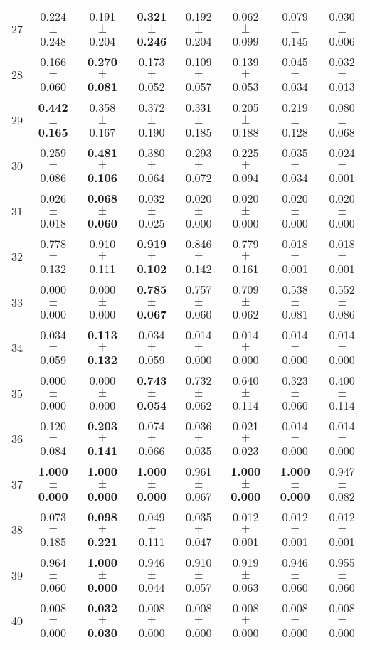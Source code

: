 \begin{table}[!ht]
{\begin{tabular}{r c c c c c c c}
27 & 0.224 $\pm$ 0.248 & 0.191 $\pm$ 0.204 & \textbf{0.321 $\pm$ 0.246} & 0.192 $\pm$ 0.204 & 0.062 $\pm$ 0.099 & 0.079 $\pm$ 0.145 & 0.030 $\pm$ 0.006 \\
28 & 0.166 $\pm$ 0.060 & \textbf{0.270 $\pm$ 0.081} & 0.173 $\pm$ 0.052 & 0.109 $\pm$ 0.057 & 0.139 $\pm$ 0.053 & 0.045 $\pm$ 0.034 & 0.032 $\pm$ 0.013 \\
29 & \textbf{0.442 $\pm$ 0.165} & 0.358 $\pm$ 0.167 & 0.372 $\pm$ 0.190 & 0.331 $\pm$ 0.185 & 0.205 $\pm$ 0.188 & 0.219 $\pm$ 0.128 & 0.080 $\pm$ 0.068 \\
30 & 0.259 $\pm$ 0.086 & \textbf{0.481 $\pm$ 0.106} & 0.380 $\pm$ 0.064 & 0.293 $\pm$ 0.072 & 0.225 $\pm$ 0.094 & 0.035 $\pm$ 0.034 & 0.024 $\pm$ 0.001 \\
31 & 0.026 $\pm$ 0.018 & \textbf{0.068 $\pm$ 0.060} & 0.032 $\pm$ 0.025 & 0.020 $\pm$ 0.000 & 0.020 $\pm$ 0.000 & 0.020 $\pm$ 0.000 & 0.020 $\pm$ 0.000 \\
32 & 0.778 $\pm$ 0.132 & 0.910 $\pm$ 0.111 & \textbf{0.919 $\pm$ 0.102} & 0.846 $\pm$ 0.142 & 0.779 $\pm$ 0.161 & 0.018 $\pm$ 0.001 & 0.018 $\pm$ 0.001 \\
33 & 0.000 $\pm$ 0.000 & 0.000 $\pm$ 0.000 & \textbf{0.785 $\pm$ 0.067} & 0.757 $\pm$ 0.060 & 0.709 $\pm$ 0.062 & 0.538 $\pm$ 0.081 & 0.552 $\pm$ 0.086 \\
34 & 0.034 $\pm$ 0.059 & \textbf{0.113 $\pm$ 0.132} & 0.034 $\pm$ 0.059 & 0.014 $\pm$ 0.000 & 0.014 $\pm$ 0.000 & 0.014 $\pm$ 0.000 & 0.014 $\pm$ 0.000 \\
35 & 0.000 $\pm$ 0.000 & 0.000 $\pm$ 0.000 & \textbf{0.743 $\pm$ 0.054} & 0.732 $\pm$ 0.062 & 0.640 $\pm$ 0.114 & 0.323 $\pm$ 0.060 & 0.400 $\pm$ 0.114 \\
36 & 0.120 $\pm$ 0.084 & \textbf{0.203 $\pm$ 0.141} & 0.074 $\pm$ 0.066 & 0.036 $\pm$ 0.035 & 0.021 $\pm$ 0.023 & 0.014 $\pm$ 0.000 & 0.014 $\pm$ 0.000 \\
37 & \textbf{1.000 $\pm$ 0.000} & \textbf{1.000 $\pm$ 0.000} & \textbf{1.000 $\pm$ 0.000} & 0.961 $\pm$ 0.067 & \textbf{1.000 $\pm$ 0.000} & \textbf{1.000 $\pm$ 0.000} & 0.947 $\pm$ 0.082 \\
38 & 0.073 $\pm$ 0.185 & \textbf{0.098 $\pm$ 0.221} & 0.049 $\pm$ 0.111 & 0.035 $\pm$ 0.047 & 0.012 $\pm$ 0.001 & 0.012 $\pm$ 0.001 & 0.012 $\pm$ 0.001 \\
39 & 0.964 $\pm$ 0.060 & \textbf{1.000 $\pm$ 0.000} & 0.946 $\pm$ 0.044 & 0.910 $\pm$ 0.057 & 0.919 $\pm$ 0.063 & 0.946 $\pm$ 0.060 & 0.955 $\pm$ 0.060 \\
40 & 0.008 $\pm$ 0.000 & \textbf{0.032 $\pm$ 0.030} & 0.008 $\pm$ 0.000 & 0.008 $\pm$ 0.000 & 0.008 $\pm$ 0.000 & 0.008 $\pm$ 0.000 & 0.008 $\pm$ 0.000 \\
\end{tabular}}
\end{table}
